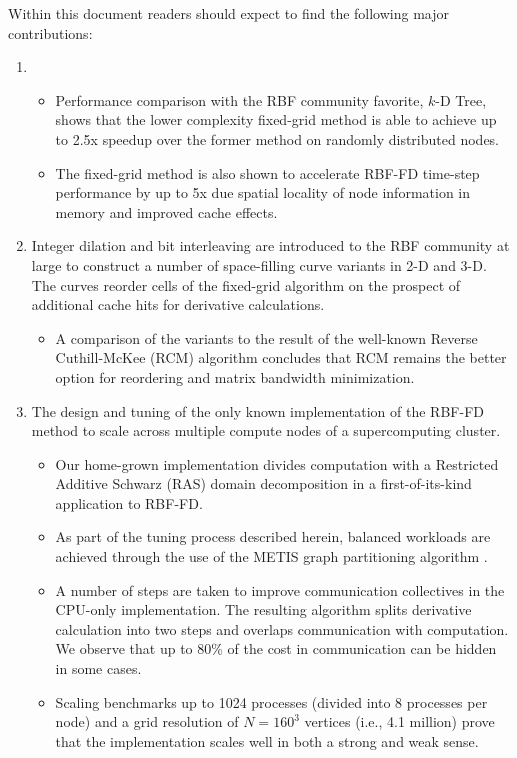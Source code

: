Within this document readers should expect to find the following major contributions: 
\begin{enumerate} 
\item 
\begin{itemize} 
\item Performance comparison with the RBF community favorite, $k$-D Tree, shows that the lower complexity fixed-grid method is able to achieve up to 2.5x speedup over the former method on randomly distributed nodes. 
\item The fixed-grid method is also shown to accelerate RBF-FD time-step performance by up to 5x due spatial locality of node information in memory and improved cache effects.
\end{itemize} 
\item Integer dilation and bit interleaving are introduced to the RBF community at large to construct a number of space-filling curve variants in 2-D and 3-D. The curves reorder cells of the fixed-grid algorithm on the prospect of additional cache hits for derivative calculations. 
\begin{itemize} 
\item A comparison of the variants to the result of the well-known Reverse Cuthill-McKee (RCM) algorithm concludes that RCM remains the better option for reordering and matrix bandwidth minimization.
\end{itemize} 
\item The design and tuning of the only known implementation of the RBF-FD method to scale across multiple compute nodes of a supercomputing cluster.
\begin{itemize} 
\item Our home-grown implementation divides computation with a Restricted Additive Schwarz (RAS) domain decomposition in a first-of-its-kind application to RBF-FD. %
\item As part of the tuning process described herein, balanced workloads are achieved through the use of the METIS graph partitioning algorithm \cite{Karypis1999}.  
\item A number of steps are taken to improve communication collectives in the CPU-only implementation. The resulting algorithm splits derivative calculation into two steps and overlaps communication with computation. We observe that up to 80\% of the cost in communication can be hidden in some cases. 
\item Scaling benchmarks up to 1024 processes (divided into 8 processes per node) and a grid resolution of $N=160^3$ vertices (i.e., 4.1 million) prove that the implementation scales well in both a strong and weak sense. 

\end{itemize}
\end{enumerate}
